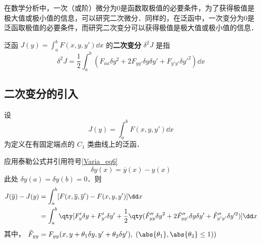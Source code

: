 
\begin{issues}
\issueTODO
\end{issues}

在数学分析中，一次（或阶）微分为0是函数取极值的必要条件，为了获得极值是极大值或极小值的信息，可以研究二次微分．同样的，在泛函中，一次变分为0是泛函取极值的必要条件，而研究二次变分可以获得极值是极大值或极小值的信息．

泛函 $J(y)=\int_a^bF(x,y,y')\dd x$ 的\textbf{二次变分} $\delta^2J$ 是指
\begin{equation}
\delta^2J=\frac{1}{2}\int_a^b(F_{aa}\delta y^2+2F_{yy'}\delta y\delta y'+F_{y'y'}\delta y'^2)\dd x
\end{equation}
\subsection{二次变分的引入}
设 
\begin{equation}
J(y)=\int_a^bF(x,y,y')\dd x
\end{equation}
为定义在有固定端点的 $C_1$ 类曲线上的泛函．

应用泰勒公式并引用符号\autoref{Varia_eq6}~
\begin{equation}
\delta y(x)=\overline{y}(x)-y(x)
\end{equation}
此处 $\delta y(a)=\delta y(b)=0$．则
\begin{equation}
\begin{aligned}
J(\overline{y})-J(y)&=\int_a^b[F(x,\overline{y},\overline{y}')-F(x,y,y')]\dd x\\
&=\int_a^b\qty[F'_y\delta y+F'_{y'}\delta y'+\frac{1}{2}\qty(\tilde{F}''_{yy}\delta y^2+2\tilde{F}''_{yy'}\delta y\delta y'+\tilde{F}''_{y'y'}\delta y'^2)]\dd x
\end{aligned}
\end{equation}
其中， $\tilde{F}_{yy}=F_{yy}(x,y+\theta_1\delta y,y'+\theta_2\delta y'),\;(\abs{\theta_1},\abs{\theta_2}\leq1))$